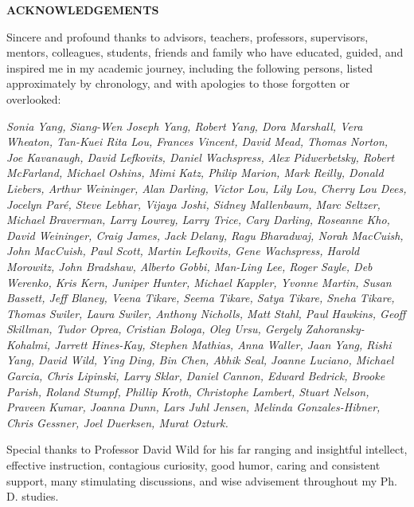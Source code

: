 \begin{centering}
\textbf{ACKNOWLEDGEMENTS}\\
\vspace{\baselineskip}
\end{centering}

Sincere and profound thanks to advisors, teachers, professors, supervisors, mentors, colleagues, students, friends and family who have educated, guided, and inspired me in my academic journey, including the following persons, listed approximately by chronology, and with apologies to those forgotten or overlooked:

\begin{singlespace}
\textit{Sonia Yang, Siang-Wen Joseph Yang, Robert Yang, Dora Marshall, Vera Wheaton, Tan-Kuei Rita Lou, Frances Vincent, David Mead, Thomas Norton, Joe Kavanaugh, David Lefkovits, Daniel Wachspress, Alex Pidwerbetsky, Robert McFarland, Michael Oshins, Mimi Katz, Philip Marion, Mark Reilly, Donald Liebers, Arthur Weininger, Alan Darling, Victor Lou, Lily Lou, Cherry Lou Dees, Jocelyn Par\'e, Steve Lebhar, Vijaya Joshi, Sidney Mallenbaum, Marc Seltzer, Michael Braverman, Larry Lowrey, Larry Trice, Cary Darling, Roseanne Kho, David Weininger, Craig James, Jack Delany, Ragu Bharadwaj, Norah MacCuish, John MacCuish, Paul Scott, Martin Lefkovits, Gene Wachspress, Harold Morowitz, John Bradshaw, Alberto Gobbi, Man-Ling Lee, Roger Sayle, Deb Werenko, Kris Kern, Juniper Hunter, Michael Kappler, Yvonne Martin, Susan Bassett, Jeff Blaney, Veena Tikare, Seema Tikare, Satya Tikare, Sneha Tikare, Thomas Swiler, Laura Swiler, Anthony Nicholls, Matt Stahl, Paul Hawkins, Geoff Skillman, Tudor Oprea, Cristian Bologa, Oleg Ursu, Gergely Zahoransky-Kohalmi, Jarrett Hines-Kay, Stephen Mathias, Anna Waller, Jaan Yang, Rishi Yang, David Wild, Ying Ding, Bin Chen, Abhik Seal, Joanne Luciano, Michael Garcia, Chris Lipinski, Larry Sklar, Daniel Cannon, Edward Bedrick, Brooke Parish, Roland Stumpf, Phillip Kroth, Christophe Lambert, Stuart Nelson, Praveen Kumar, Joanna Dunn, Lars Juhl Jensen, Melinda Gonzales-Hibner, Chris Gessner, Joel Duerksen, Murat Ozturk.}
\end{singlespace}

Special thanks to Professor David Wild for his far ranging and insightful intellect, effective instruction, contagious curiosity, good humor, caring and consistent support, many stimulating discussions, and wise advisement throughout my Ph. D. studies.